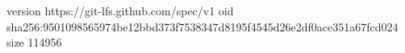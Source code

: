 version https://git-lfs.github.com/spec/v1
oid sha256:9501098565974be12bbd373f7538347d8195f4545d26e2df0ace351a67fcd024
size 114956

